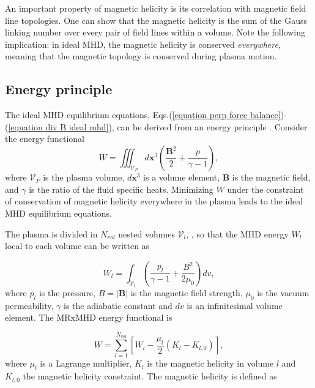 \documentclass[my_thesis.tex]{subfiles}
\begin{document}
An important property of magnetic helicity is its correlation with magnetic field line topologies. One can show \citep{moffattDegreeKnottednessTangled1969, arnoldTopologicalPropertiesMagnetic1998, bergerIntroductionMagneticHelicity1999} that the magnetic helicity is the sum of the Gauss linking number over every pair of field lines within a volume. Note the following implication: in ideal MHD, the magnetic helicity is conserved \emph{everywhere}, meaning that the magnetic topology is conserved during plasma motion.





\subsection{Energy principle}
The ideal MHD equilibrium equations, Eqs.(\ref{equation perp force balance})-(\ref{equation div B ideal mhd}), can be derived from an energy principle \citep{kruskalEquilibriumMagneticallyConfined1958}. Consider the energy functional 
\begin{equation}
	W = \iiint_{\mathcal{V}_P} d\mathbf{x}^3 \left(\frac{\mathbf{B}^2}{2} + \frac{p}{\gamma-1}\right), \label{eq. energy functional}
\end{equation}
where $\mathcal{V}_P$ is the plasma volume, $d\mathbf{x}^3$ is a volume element, $\mathbf{B}$ is the magnetic field, and $\gamma$ is the ratio of the fluid specific heats. Minimizing $W$ under the constraint of conservation of magnetic helicity everywhere in the plasma leads to the ideal MHD equilibrium equations. 





The plasma is divided in $N_{vol}$ nested volumes $\mathcal{V}_l$, , so that the MHD energy $W_l$ \citep{kruskal_equilibrium_1958} local to each volume can be written as

\begin{equation}
	W_l = \int_{\mathcal{V}_l} \left(\frac{p_l}{\gamma-1}+\frac{B^2}{2\mu_0}\right)dv,
\end{equation}
where $p_l$ is the pressure, $B=|\mathbf{B}|$ is the magnetic field strength, $\mu_0$ is the vacuum permeability, $\gamma$ is the adiabatic constant and $dv$ is an infinitesimal volume element. The \ac{MRxMHD} energy functional is \citep{Hudson2012}

\begin{equation}
	W = \sum_{l=1}^{N_{vol}} \left[W_l -\frac{\mu_l}{2}(K_l-K_{l,0})\right], \label{eq.energy}
\end{equation}
where $\mu_l$ is a Lagrange multiplier, $K_l$ is the magnetic helicity in volume $l$ and $K_{l,0}$ the magnetic helicity constraint. The magnetic helicity is defined as 
\end{document}
